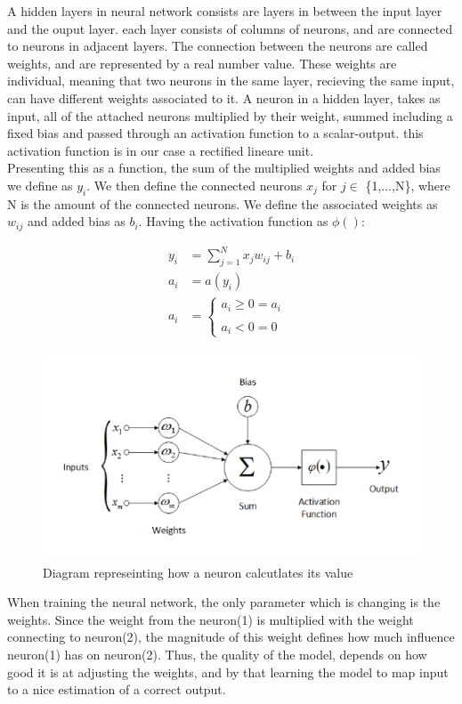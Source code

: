 
A hidden layers in neural network consists are layers in between the input layer and the ouput layer. each layer consists of columns of neurons, and are connected to neurons in adjacent layers. The connection between the neurons are called weights, and are represented by a real number value. These weights are individual, meaning that two neurons in the same layer, recieving the same input, can have different weights associated to it. A neuron in a hidden layer, takes as input, all of the attached neurons multiplied by their weight, summed including a fixed bias and passed through an activation function to a scalar-output. this activation function is in our case a rectified lineare unit.\\

\noindent
Presenting this as a function, the sum of the multiplied weights and added bias we define as $y_i$. We then define the connected neurons $x_j$ for $j \in$ \{1,...,N\}, where N is the amount of the connected neurons. We define the associated weights as $w_{ij}$ and added bias as $b_i$. Having the activation function as $\phi()$:

\begin{align}
	y_i &= \sum^N_{j=1} x_jw_{ij} + b_i\\
	a_i &= a(y_i) \\
	a_i &=\left\{ \begin{matrix}
		a_i \geq 0 = a_i \\
		\\
		a_i < 0 = 0
	\end{matrix}
	\right.
\end{align}


\begin{figure}[!ht]
  \centering
  \includegraphics[scale=1.0]{latex/IMGs/neuronFunc.png}
  \caption{Diagram represeinting how a neuron calcutlates its value}\label{Baseline:before}
\end{figure}

\noindent
When training the neural network, the only parameter which is changing is the weights. Since the weight from the neuron(1) is multiplied with the weight connecting to neuron(2), the magnitude of this weight defines how much influence neuron(1) has on neuron(2). Thus, the quality of the model, depends on how good it is at adjusting the weights, and by that learning the model to map input to a nice estimation of a correct output.
